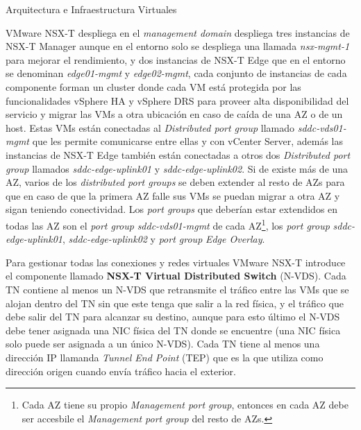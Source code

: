 \begin{subsection}{Arquitectura e Infraestructura Virtuales\cite{CFVirtInfraes}}

VMware NSX-T despliega en el \textit{management domain} despliega tres instancias de NSX-T Manager aunque en el entorno solo se despliega una llamada \textit{nsx-mgmt-1} para mejorar el rendimiento, y dos instancias de NSX-T Edge que en el entorno se denominan \textit{edge01-mgmt} y \textit{edge02-mgmt}, cada conjunto de instancias de cada componente forman un cluster donde cada VM está protegida por las funcionalidades vSphere HA y vSphere DRS para proveer alta disponibilidad del servicio y migrar las VMs a otra ubicación en caso de caída de una AZ o de un host. Estas VMs están conectadas al \textit{Distributed port group} llamado \textit{sddc-vds01-mgmt} que les permite comunicarse entre ellas y con vCenter Server, además las instancias de NSX-T Edge también están conectadas a otros dos \textit{Distributed port group} llamados \textit{sddc-edge-uplink01} y \textit{sddc-edge-uplink02}. Si de existe más de una AZ, varios de los \textit{distributed port groups} se deben extender al resto de AZs para que en caso de que la primera AZ falle sus VMs se puedan migrar a otra AZ y sigan teniendo conectividad. Los \textit{port groups} que deberían estar extendidos en todas las AZ son el \textit{port group} \textit{sddc-vds01-mgmt} de cada AZ\footnote{Cada AZ tiene su propio \textit{Management port group}, entonces en cada AZ debe ser accesbile el \textit{Management port group} del resto de AZs.}, los \textit{port group} \textit{sddc-edge-uplink01}, \textit{sddc-edge-uplink02} y \textit{port group} \textit{Edge Overlay}.

Para gestionar todas las conexiones y redes virtuales VMware NSX-T introduce el componente llamado \textbf{NSX-T Virtual Distributed Switch} (N-VDS). Cada TN contiene al menos un N-VDS que retransmite el tráfico entre las VMs que se alojan dentro del TN sin que este tenga que salir a la red física, y el tráfico que debe salir del TN para alcanzar su destino, aunque para esto último el N-VDS debe tener asignada una NIC física del TN donde se encuentre (una NIC física solo puede ser asignada a un único N-VDS). Cada TN tiene al menos una dirección IP llamanda \textit{Tunnel End Point} (TEP) que es la que utiliza como dirección origen cuando envía tráfico hacia el exterior.


\end{subsection}
